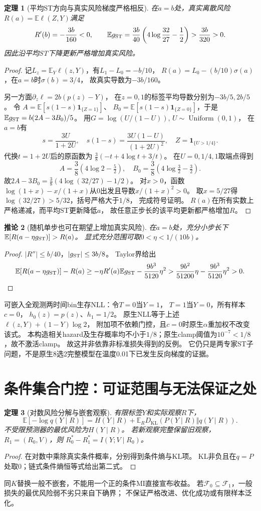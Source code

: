 \documentclass[UTF8,fontset=fandol,11pt,a4paper]{ctexart}
\newtheorem{theorem}{定理}[section]
\newtheorem{corollary}[theorem]{推论}
\theoremstyle{remark}
\newcommand{\E}{\mathbb E}
\newcommand{\KL}{D_{\mathrm{KL}}}
\newcommand{\ind}{\mathbf 1}
\begin{document}
\begin{theorem}[平均ST方向与真实风险梯度严格相反]\label{th:st}
在$a=b$处，真实离散风险$R(a)=\E\ell(Z,Y)$满足
\[
 R'(b)=-\frac{3b}{160}<0,\qquad
 \E g_{\rm ST}=\frac{3b}{40}
 \left(4\log\frac{32}{27}-\frac12\right)>\frac{3b}{320}>0.
\]
因此沿平均ST下降更新严格增加真实风险。
\end{theorem}
\begin{proof}
记$L_z=\E_Y\ell(z,Y)$，有$L_1-L_0=-b/10$，
$R(a)=L_0-(b/10)\sigma(a)$，在$a=b$时$\sigma(b)=3/4$，
故真实导数为$-3b/160$。

另一方面$\partial_z\ell=2b(p(z)-Y)$，
在$z=0,1$的标签平均导数分别为$-3b/5,2b/5$。
令
$A=\E[s(1-s)\ind_{\{Z=1\}}]$、
$B_0=\E[s(1-s)\ind_{\{Z=0\}}]$，于是
$\E g_{\rm ST}=b(2A-3B_0)/5$。
用$G=\log(U/(1-U)),\,U\sim\operatorname{Uniform}(0,1)$，
在$a=b$有
\[
 s=\frac{3U}{1+2U},\quad
 s(1-s)=\frac{3U(1-U)}{(1+2U)^2},\quad Z=\ind_{\{U>1/4\}}.
\]
代换$t=1+2U$后的原函数为
$\frac38(-t+4\log t+3/t)$。
在$U=0,1/4,1$取端点得到
\[
 A=\frac38(4\log2-\tfrac52),\quad
 B_0=\frac38(4\log\tfrac32-\tfrac32).
\]
故$2A-3B_0=\frac38(4\log(32/27)-1/2)$。
对$x>0$，函数$\log(1+x)-x/(1+x)$从0出发且导数$x/(1+x)^2>0$。
取$x=5/27$得$\log(32/27)>5/32$，括号严格大于$1/8$，
完成符号证明。
$R(a)$在所有实数上严格递减，而平均ST更新降低$a$，
故任意正步长的该平均更新都严格增加$R$。
\end{proof}
\begin{corollary}[随机单步也可在期望上增加真实风险]
在$a=b$处，充分小步长下$\E[R(a-\eta g_{\rm ST})]>R(a)$。
显式充分范围可取$0<\eta<1/(10b)$。
\end{corollary}
\begin{proof}
$|R''|\le b/40$，$|g_{\rm ST}|\le3b/8$。
Taylor界给出
\[
 \E[R(a-\eta g_{\rm ST})]-R(a)
 \ge-\eta R'(a)\E g_{\rm ST}
      -\frac{9b^3}{5120}\eta^2
 >\frac{9b^2}{51200}\eta-\frac{9b^3}{5120}\eta^2>0.
\]
\end{proof}
可嵌入全观测两时间bin生存NLL：令$T=0$当$Y=1$，
$T=1$当$Y=0$，所有样本$c=0$，
$h_0(z)=p(z)$、$h_1=1/2$。
原生NLL等于上述$\ell(z,Y)+(1-Y)\log2$，
附加项不依赖门控，且$c=0$时原生$\alpha$重加权不改变该式。
本构造相关hazard及生存概率均不小于$1/8$；原生clamp阈值为$10^{-7}<1/8$，故不激活clamp。
故这并非依靠非标准损失得到的反例。
它仍只是两专家ST子问题，不是原生8选2完整模型在温度0.01下已发生反向梯度的证据。

\section{条件集合门控：可证范围与无法保证之处}
\begin{theorem}[对数风险分解与嵌套观察]
有限标签$Y$和实际观察$R$下，
\[
 \E[-\log q(Y\mid R)]
 =H(Y\mid R)+\E_R\KL(P(Y\mid R)\Vert q(Y\mid R)).
\]
不受限预测器的最优风险为$H(Y\mid R)$。
若新观察完整保留旧观察，$R_1=(R_0,V)$，则
$R_0^*-R_1^*=I(Y;V\mid R_0)$。
\end{theorem}
\begin{proof}
在对数中乘除真实条件概率，分别得到条件熵与KL项。
KL非负且在$q=P$处取0；链式条件熵恒等式给出第二式。
\end{proof}
同$K$替换一般不嵌套，不能用一个正的条件MI直接宣布收益。
若$\mathcal F_0\subseteq\mathcal F_1$，一般损失的最优风险弱不劣只来自下确界；
不保证严格改进、优化成功或有限样本泛化。
\end{document}
